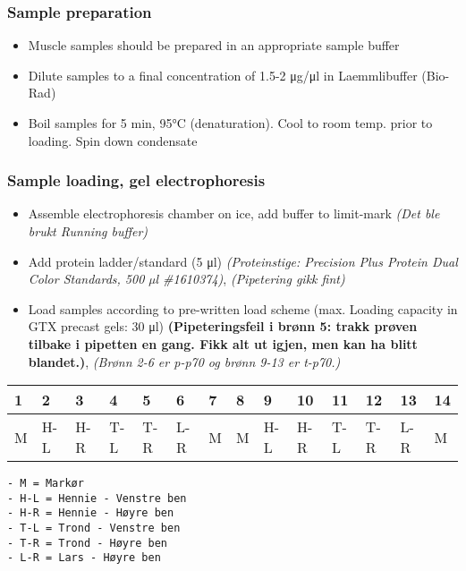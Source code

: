 \documentclass[
  letterpaper,
  DIV=11,
  numbers=noendperiod]{scrreprt}
\providecommand{\tightlist}{%
  \setlength{\itemsep}{0pt}\setlength{\parskip}{0pt}}\usepackage{longtable,booktabs,array}
\begin{document}
\subsubsection{Sample preparation}\label{sample-preparation}

\begin{itemize}
\tightlist
\item
  Muscle samples should be prepared in an appropriate sample buffer
\item
  Dilute samples to a final concentration of 1.5-2 μg/μl in
  Laemmlibuffer (Bio-Rad)
\item
  Boil samples for 5 min, 95°C (denaturation). Cool to room temp. prior
  to loading. Spin down condensate
\end{itemize}

\subsubsection{Sample loading, gel
electrophoresis}\label{sample-loading-gel-electrophoresis}

\begin{itemize}
\item
  Assemble electrophoresis chamber on ice, add buffer to limit-mark
  \emph{(Det ble brukt Running buffer)}
\item
  Add protein ladder/standard (5 μl) \emph{(Proteinstige: Precision Plus
  Protein Dual Color Standards, 500 µl \#1610374)}, \emph{(Pipetering
  gikk fint)}
\item
  Load samples according to pre-written load scheme (max. Loading
  capacity in GTX precast gels: 30 μl) \textbf{(Pipeteringsfeil i brønn
  5: trakk prøven tilbake i pipetten en gang. Fikk alt ut igjen, men kan
  ha blitt blandet.)}, \emph{(Brønn 2-6 er p-p70 og brønn 9-13 er
  t-p70.)}
\end{itemize}

\begin{longtable}[]{@{}llllllllllllll@{}}
\toprule\noalign{}
1 & 2 & 3 & 4 & 5 & 6 & 7 & 8 & 9 & 10 & 11 & 12 & 13 & 14 \\
\midrule\noalign{}
\endhead
\bottomrule\noalign{}
\endlastfoot
M & H-L & H-R & T-L & T-R & L-R & M & M & H-L & H-R & T-L & T-R & L-R &
M \\
\end{longtable}

\begin{verbatim}
- M = Markør
- H-L = Hennie - Venstre ben
- H-R = Hennie - Høyre ben
- T-L = Trond - Venstre ben
- T-R = Trond - Høyre ben
- L-R = Lars - Høyre ben
\end{verbatim}
\end{document}
